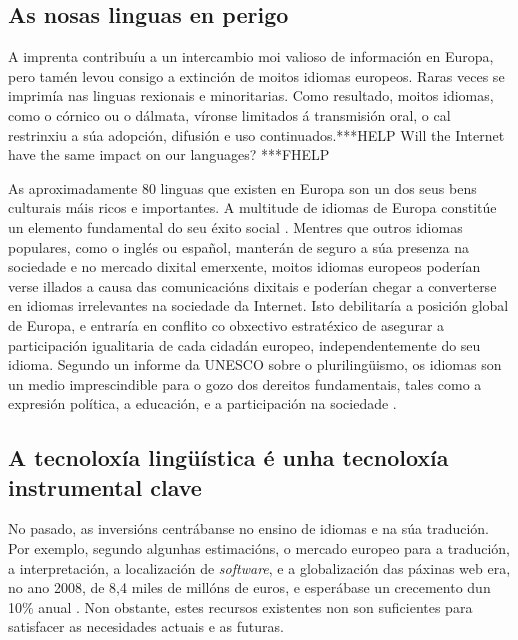 \begin{multicols}{2}
\subsection{As nosas linguas en perigo}

    A imprenta contribuíu a un intercambio moi valioso de información en Europa, pero tamén levou consigo a extinción de moitos idiomas europeos. Raras veces se imprimía nas linguas rexionais e minoritarias. Como resultado, moitos idiomas, como o córnico ou o dálmata, víronse limitados á transmisión oral, o cal restrinxiu a súa adopción, difusión e uso continuados.***HELP Will the Internet have the same impact on our languages? ***FHELP



As aproximadamente 80 linguas que existen en Europa son un dos seus bens culturais máis ricos e importantes. A multitude de idiomas de Europa constitúe un elemento fundamental do seu éxito social \cite{GAL-Nota2}. Mentres que outros idiomas populares, como o inglés ou español, manterán de seguro a súa presenza na sociedade e no mercado dixital emerxente, moitos idiomas europeos poderían verse illados a causa das comunicacións dixitais e poderían chegar a converterse en idiomas irrelevantes na sociedade da Internet. Isto debilitaría a posición global de Europa, e entraría en conflito co obxectivo estratéxico de asegurar a participación igualitaria de cada cidadán europeo, independentemente do seu idioma. Segundo un informe da UNESCO sobre o plurilingüismo, os idiomas son un medio imprescindible para o gozo dos dereitos fundamentais, tales como a expresión política, a educación, e a participación na sociedade \cite{GAL-Nota3}.

\subsection{A tecnoloxía lingüística é unha tecnoloxía instrumental clave}

   No pasado, as inversións centrábanse no ensino de idiomas e na súa tradución. Por exemplo, segundo algunhas estimacións, o mercado europeo para a tradución, a interpretación, a localización de \textit{software}, e a globalización das páxinas web era, no ano 2008, de 8,4 miles de millóns de euros, e esperábase un crecemento dun 10\% anual \cite{GAL-Nota4}.  Non obstante, estes recursos existentes non son suficientes para satisfacer as necesidades actuais e as futuras. 


\end{multicols}
